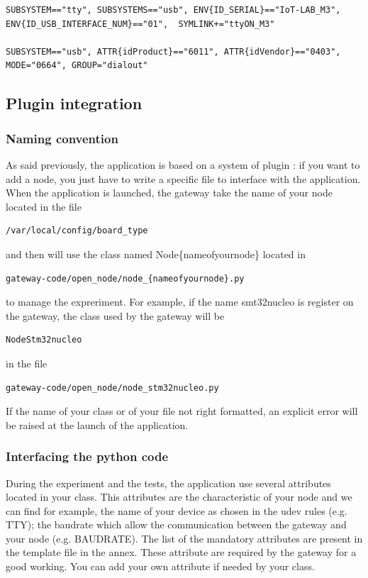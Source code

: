 \documentclass[12pt,a4paper,twoside]{article}
\begin{document}
\begin{verbatim}
SUBSYSTEM=="tty", SUBSYSTEMS=="usb", ENV{ID_SERIAL}=="IoT-LAB_M3", 
ENV{ID_USB_INTERFACE_NUM}=="01",  SYMLINK+="ttyON_M3"

SUBSYSTEM=="usb", ATTR{idProduct}=="6011", ATTR{idVendor}=="0403", 
MODE="0664", GROUP="dialout"
\end{verbatim}
\subsection{Plugin integration}
\subsubsection{Naming convention}
As said previously, the application is based on a system of plugin : if you want to add a node, you just have to write a specific file to interface with the application.\newline
When the application is launched, the gateway take the name of your node located in the file \begin{verbatim}/var/local/config/board_type\end{verbatim} 
and then will use the class named Node\{nameofyournode\} located in \begin{verbatim}gateway-code/open_node/node_{nameofyournode}.py\end{verbatim}
to manage the expreriment. \newline
For example, if the name smt32nucleo is register on the gateway, the class used by the gateway will be 
\begin{verbatim}NodeStm32nucleo \end{verbatim}
in the file 
\begin{verbatim}gateway-code/open_node/node_stm32nucleo.py\end{verbatim}
If the name of your class or of your file not right formatted, an explicit error will be raised at the launch of the application.
\subsubsection{Interfacing the python code}
During the experiment and the tests, the application use several attributes located in your class. This attributes are the characteristic of your node and we can find for example, the name of your device as chosen in the udev rules (e.g. TTY); the baudrate which allow the communication between the gateway and your node (e.g. BAUDRATE).\newline
The list of the mandatory attributes are present in the template file in the annex. These attribute are required by the gateway for a good working.\newline
You can add your own attribute if needed by your class.\newline
\end{document}
